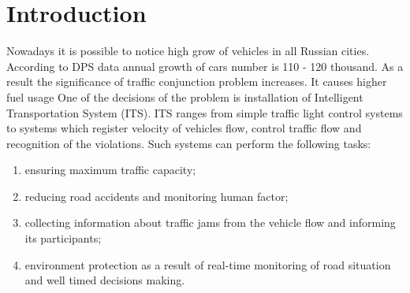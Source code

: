 \documentclass[12pt,a4paper,oneside,titlepage]{article}
\begin{document}
\section{Introduction}
Nowadays it is possible to notice high grow of vehicles in all Russian cities.
According to DPS data annual growth of cars number is 110 - 120 thousand.
As a result the significance of traffic conjunction problem increases.
It causes higher fuel usage 
One of the decisions of the problem is installation of Intelligent Transportation System (ITS).
ITS ranges from simple traffic light control systems to systems which register velocity of vehicles flow, control traffic flow and recognition of the violations.
Such systems can perform the following tasks:
\begin{enumerate}
  \item ensuring maximum traffic capacity;
  \item reducing road accidents and monitoring human factor;
  \item collecting information about traffic jams from the vehicle flow and informing its participants;
  \item environment protection as a result of real-time monitoring of road situation and well timed decisions making.
\end{enumerate}
\end{document}
